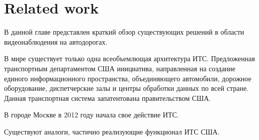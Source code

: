 \documentclass[12pt,a4paper,oneside,titlepage]{article}
\begin{document}
\newpage
\section*{Related work}
В данной главе представлен краткий обзор существующих решений в области видеонаблюдения на автодорогах.

В мире существует только одна всеобъемлющая архитектура ИТС. Предложенная транспортным департаментом США инициатива, направленная на создание единого информационного пространства, объединяющего автомобили, дорожное оборудование, диспетчерские залы и центры обработки данных по всей стране. Данная транспортная система запатентована правительством США.

В городе Москве в 2012 году начала свое действие ИТС.

Существуют аналоги, частично реализующие функционал ИТС США.






























\newpage
\end{document}
